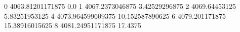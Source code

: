 0 4063.81201171875 0.0
1 4067.2373046875 3.42529296875
2 4069.64453125 5.83251953125
4 4073.964599609375 10.152587890625
6 4079.201171875 15.38916015625
8 4081.24951171875 17.4375

